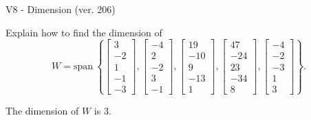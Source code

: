 \begin{exercise}
  \begin{exerciseTitle}V8 - Dimension (ver. 206)\end{exerciseTitle}
  \begin{exerciseStatement}
    Explain how to find the dimension of 
\[W=\mathrm{span}\ \left\{\left[\begin{array}{r}
3 \\
-2 \\
1 \\
-1 \\
-3
\end{array}\right] , \left[\begin{array}{r}
-4 \\
2 \\
-2 \\
3 \\
-1
\end{array}\right] , \left[\begin{array}{r}
19 \\
-10 \\
9 \\
-13 \\
1
\end{array}\right] , \left[\begin{array}{r}
47 \\
-24 \\
23 \\
-34 \\
8
\end{array}\right] , \left[\begin{array}{r}
-4 \\
-2 \\
-3 \\
1 \\
3
\end{array}\right]\right\}.\]



  \end{exerciseStatement}
  \begin{exerciseAnswer}
   The dimension of \(W\) is  \(3\).
  


  \end{exerciseAnswer}
\end{exercise}